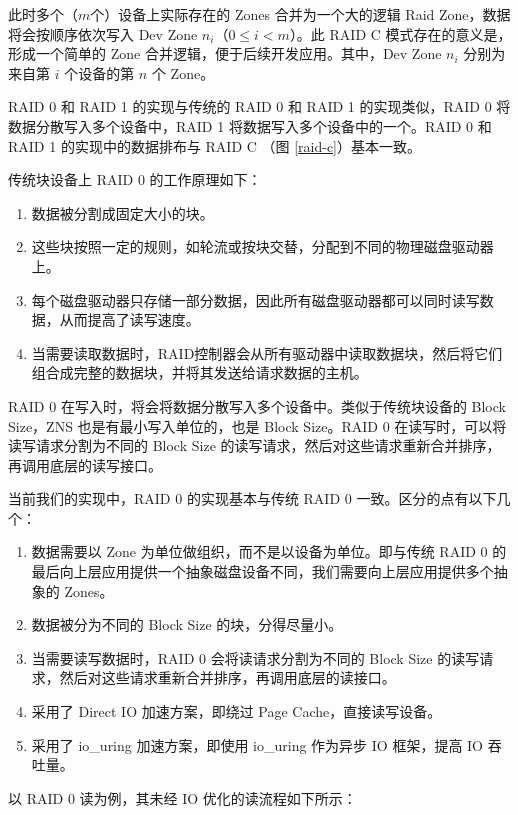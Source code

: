 此时多个（$m$个）设备上实际存在的 Zones 合并为一个大的逻辑 Raid Zone，数据将会按顺序依次写入 Dev Zone $n_{i}$（$0 \le i < m$）。此 RAID C 模式存在的意义是，形成一个简单的 Zone 合并逻辑，便于后续开发应用。其中，Dev Zone $n_i$ 分别为来自第 $i$ 个设备的第 $n$ 个 Zone。

RAID 0 和 RAID 1 的实现与传统的 RAID 0 和 RAID 1 的实现类似，RAID 0 将数据分散写入多个设备中，RAID 1 将数据写入多个设备中的一个。RAID 0 和 RAID 1 的实现中的数据排布与 RAID C （图 \ref{raid-c}）基本一致。

传统块设备上 RAID 0 的工作原理如下：

\begin{enumerate}
  \item 数据被分割成固定大小的块。
  \item 这些块按照一定的规则，如轮流或按块交替，分配到不同的物理磁盘驱动器上。
  \item 每个磁盘驱动器只存储一部分数据，因此所有磁盘驱动器都可以同时读写数据，从而提高了读写速度。
  \item 当需要读取数据时，RAID控制器会从所有驱动器中读取数据块，然后将它们组合成完整的数据块，并将其发送给请求数据的主机。
\end{enumerate}

RAID 0 在写入时，将会将数据分散写入多个设备中。类似于传统块设备的 Block Size，ZNS 也是有最小写入单位的，也是 Block Size。RAID 0 在读写时，可以将读写请求分割为不同的 Block Size 的读写请求，然后对这些请求重新合并排序，再调用底层的读写接口。

当前我们的实现中，RAID 0 的实现基本与传统 RAID 0 一致。区分的点有以下几个：

\begin{enumerate}
  \item 数据需要以 Zone 为单位做组织，而不是以设备为单位。即与传统 RAID 0 的最后向上层应用提供一个抽象磁盘设备不同，我们需要向上层应用提供多个抽象的 Zones。
  \item 数据被分为不同的 Block Size 的块，分得尽量小。
  \item 当需要读写数据时，RAID 0 会将读请求分割为不同的 Block Size 的读写请求，然后对这些请求重新合并排序，再调用底层的读接口。
  \item 采用了 Direct IO 加速方案，即绕过 Page Cache，直接读写设备。
  \item 采用了 io\_uring 加速方案，即使用 io\_uring 作为异步 IO 框架，提高 IO 吞吐量。
\end{enumerate}

以 RAID 0 读为例，其未经 IO 优化的读流程如下所示：

